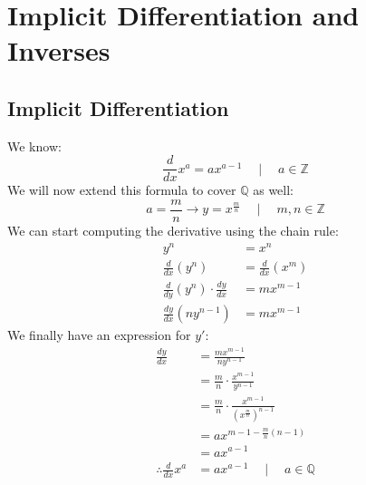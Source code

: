 \documentclass[../main.tex]{subfiles}
\begin{document}
%
\chapter{Implicit Differentiation and Inverses}
\section{Implicit Differentiation}
%
We know:
\[ \frac{d}{dx} x^a = ax^{a-1} \quad \mid \quad a \in \mathbb{Z} \]
We will now extend this formula to cover $\mathbb{Q}$ as well:
\[
    a = \frac{m}{n} \rightarrow y = x^{\frac{m}{n}}
    \quad \mid \quad
    m, n \in \mathbb{Z}
\]
We can start computing the derivative using the chain rule:%
%
\begin{align*}
    y^n                                                 &= x^n                              \\
    \frac{d}{dx} \left( y^n \right)                     &= \frac{d}{dx} \left( x^m \right)  \\
    \frac{d}{dy} \left( y^n \right) \cdot \frac{dy}{dx} &= mx^{m - 1}                       \\
    \frac{dy}{dx} \left( ny^{n - 1} \right)             &= mx^{m - 1}
\end{align*}
%
We finally have an expression for $y'$:
%
\begin{align*}
    \frac{dy}{dx}               &= \frac{mx^{m - 1}}{ny^{n - 1}}                                                \\
                                &= \frac{m}{n} \cdot \frac{x^{m - 1}}{y^{n - 1}}                                \\
                                &= \frac{m}{n} \cdot \frac{x^{m - 1}}{\left( x^{\frac{m}{n}} \right)^{n - 1}}   \\
                                &= ax^{m - 1 - \frac{m}{n}(n - 1)}                                              \\
                                &= ax^{a - 1}                                                                   \\
    \therefore \frac{d}{dx} x^a &= ax^{a - 1} \quad \mid \quad a \in \mathbb{Q}
\end{align*}
%
\end{document}
